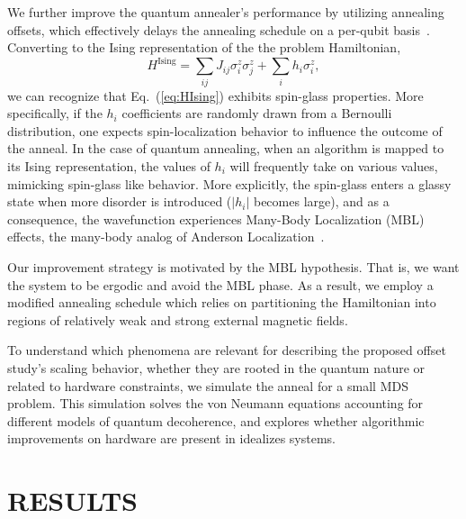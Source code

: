 \documentclass[prd,twocolumn,tightenlines,preprintnumbers,showpacs,superscriptaddress,notitlepage,nofootinbib,eqsecnum,floatfix,longbibliography,aps,10pt]{revtex4-2}
\begin{document}
We further improve the quantum annealer's performance by utilizing annealing offsets, which effectively delays the annealing schedule on a per-qubit basis~\cite{PhysRevA.96.042322,hsu2018quantum,10.1007/978-3-030-14082-3_14}.
Converting to the Ising representation of the the problem Hamiltonian,
\begin{equation}
    \label{eq:HIsing}
     H^{\textrm{Ising}} = \sum_{ij} J_{ij} \sigma^z_i \sigma^z_j + \sum_i h_i \sigma^z_i ,
\end{equation}
we can recognize that Eq.~(\ref{eq:HIsing}) exhibits spin-glass properties. More specifically, if the $h_i$ coefficients are randomly drawn from a Bernoulli distribution, one expects spin-localization behavior to influence the outcome of the anneal.
In the case of quantum annealing, when an algorithm is mapped to its Ising representation, the values of $h_i$ will frequently take on various values, mimicking spin-glass like behavior.
More explicitly, the spin-glass enters a glassy state when more disorder is introduced ($|h_i|$ becomes large), and as a consequence, the wavefunction experiences Many-Body Localization (MBL) effects, the many-body analog of Anderson Localization~\cite{doi:10.1146/annurev-conmatphys-031214-014726,PhysRevE.90.022103,RevModPhys.91.021001,ALET2018498,PhysRevB.82.174411,PhysRevLett.109.017202}.

Our improvement strategy is motivated by the MBL hypothesis.
That is, we want the system to be ergodic and avoid the MBL phase.
As a result, we employ a modified annealing schedule which relies on partitioning the Hamiltonian into regions of relatively weak and strong external magnetic fields.


To understand which phenomena are relevant for describing the proposed offset study's scaling behavior, whether they are rooted in the quantum nature or related to hardware constraints, we simulate the anneal for a small MDS problem. This simulation solves the von Neumann equations accounting for different models of quantum decoherence, and explores whether algorithmic improvements on hardware are present in idealizes systems.


\section{RESULTS}
\label{sec:results}
\end{document}
